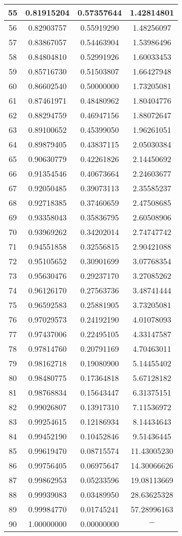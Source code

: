 \documentclass{jsarticle}
\begin{document}
\begin{longtable}{|c|c|c|c|}
	55	&0.81915204	&0.57357644	&1.42814801	\\ \hline
	56	&0.82903757	&0.55919290	&1.48256097	\\ \hline
	57	&0.83867057	&0.54463904	&1.53986496	\\ \hline
	58	&0.84804810	&0.52991926	&1.60033453	\\ \hline
	59	&0.85716730	&0.51503807	&1.66427948	\\ \hline
	60	&0.86602540	&0.50000000	&1.73205081	\\ \hline
	61	&0.87461971	&0.48480962	&1.80404776	\\ \hline
	62	&0.88294759	&0.46947156	&1.88072647	\\ \hline
	63	&0.89100652	&0.45399050	&1.96261051	\\ \hline
	64	&0.89879405	&0.43837115	&2.05030384	\\ \hline
	65	&0.90630779	&0.42261826	&2.14450692	\\ \hline
	66	&0.91354546	&0.40673664	&2.24603677	\\ \hline
	67	&0.92050485	&0.39073113	&2.35585237	\\ \hline
	68	&0.92718385	&0.37460659	&2.47508685	\\ \hline
	69	&0.93358043	&0.35836795	&2.60508906	\\ \hline
	70	&0.93969262	&0.34202014	&2.74747742	\\ \hline
	71	&0.94551858	&0.32556815	&2.90421088	\\ \hline
	72	&0.95105652	&0.30901699	&3.07768354	\\ \hline
	73	&0.95630476	&0.29237170	&3.27085262	\\ \hline
	74	&0.96126170	&0.27563736	&3.48741444	\\ \hline
	75	&0.96592583	&0.25881905	&3.73205081	\\ \hline
	76	&0.97029573	&0.24192190	&4.01078093	\\ \hline
	77	&0.97437006	&0.22495105	&4.33147587	\\ \hline
	78	&0.97814760	&0.20791169	&4.70463011	\\ \hline
	79	&0.98162718	&0.19080900	&5.14455402	\\ \hline
	80	&0.98480775	&0.17364818	&5.67128182	\\ \hline
	81	&0.98768834	&0.15643447	&6.31375151	\\ \hline
	82	&0.99026807	&0.13917310	&7.11536972	\\ \hline
	83	&0.99254615	&0.12186934	&8.14434643	\\ \hline
	84	&0.99452190	&0.10452846	&9.51436445	\\ \hline
	85	&0.99619470	&0.08715574	&11.43005230	\\ \hline
	86	&0.99756405	&0.06975647	&14.30066626	\\ \hline
	87	&0.99862953	&0.05233596	&19.08113669	\\ \hline
	88	&0.99939083	&0.03489950	&28.63625328	\\ \hline
	89	&0.99984770	&0.01745241	&57.28996163	\\ \hline
	90	&1.00000000	&0.00000000	&$\mathrm{-}$	\\ \hline
\end{longtable}
\end{document}
